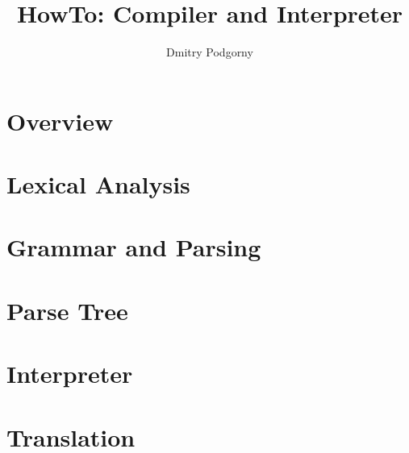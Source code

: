 \documentclass[a4paper,oneside,11pt]{book}
\title{\bfseries\Huge HowTo: Compiler and Interpreter}
\author{Dmitry Podgorny}
\begin{document}
\maketitle
\makeatletter\@openrightfalse
\tableofcontents
\@openrighttrue\makeatother

\chapter{Overview}

\chapter{Lexical Analysis}

\chapter{Grammar and Parsing}

\chapter{Parse Tree}

\chapter{Interpreter}

\chapter{Translation}
\end{document}
